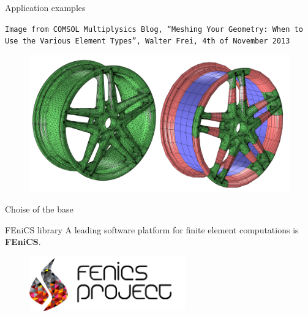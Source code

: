 \documentclass[10pt,externalviewer]{beamer}
\begin{document}
\begin{frame}{Application examples}
\begin{minipage}{0.425\textwidth}
      \tiny{\texttt{Image from COMSOL Multiplysics Blog, ``Meshing Your Geometry: When to Use the Various Element Types'', Walter Frei, 4th of November 2013}}
   \end{minipage}
   \hfill
   \begin{minipage}{0.5\textwidth}
      \begin{figure}[H]
         \raggedleft
         \includegraphics[width=\textwidth]{Immagini/mesh-application-2.png}
      \end{figure}
   \end{minipage}
\end{frame}

\begin{frame}{Choise of the base}
   
\end{frame}

\begin{frame}{FEniCS library}
   \small{A leading software platform for finite element computations is \textbf{\textcolor{BrickRed}{FEniCS}}.}

   \begin{figure}[H]
      \centering
      \includegraphics[width=0.6\textwidth]{Immagini/fenics-logo.png}
   \end{figure}
\end{frame}
\end{document}
